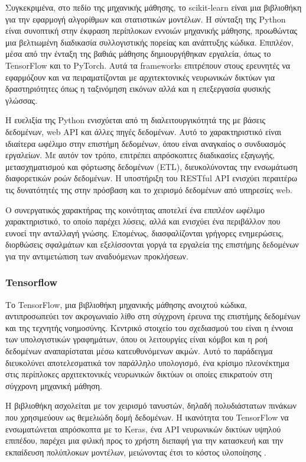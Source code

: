 Συγκεκριμένα, στο πεδίο της μηχανικής μάθησης, το scikit-learn είναι μια βιβλιοθήκη για την εφαρμογή αλγορίθμων και στατιστικών μοντέλων. Η σύνταξη της Python είναι συνοπτική στην έκφραση περίπλοκων εννοιών μηχανικής μάθησης, προωθώντας μια βελτιωμένη διαδικασία συλλογιστικής πορείας και ανάπτυξης κώδικα. Επιπλέον, μέσα από την ένταξη της βαθιάς μάθησης δημιουργήθηκαν εργαλεία, όπως το TensorFlow και το PyTorch. Αυτά τα frameworks επιτρέπουν στους ερευνητές να εφαρμόζουν και να πειραματίζονται με αρχιτεκτονικές νευρωνικών δικτύων για δραστηριότητες όπως η ταξινόμηση εικόνων αλλά και η επεξεργασία φυσικής γλώσσας.

Η ευελιξία της Python ενισχύεται από τη διαλειτουργικότητά της με βάσεις δεδομένων, web API και άλλες πηγές δεδομένων. Αυτό το χαρακτηριστικό είναι ιδιαίτερα ωφέλιμο στην επιστήμη δεδομένων, όπου είναι αναγκαίος ο συνδυασμός εργαλείων. Με αυτόν τον τρόπο, επιτρέπει απρόσκοπτες διαδικασίες εξαγωγής, μετασχηματισμού και φόρτωσης δεδομένων (ETL), διευκολύνοντας την ενσωμάτωση διαφορετικών ροών δεδομένων. Η υποστήριξη του RESTful API ενισχύει περαιτέρω τις δυνατότητές της στην πρόσβαση και το χειρισμό δεδομένων από υπηρεσίες web. 

Ο συνεργατικός χαρακτήρας της κοινότητας αποτελεί ένα επιπλέον ωφέλιμο χαρακτηριστικό, το οποίο παρέχει λύσεις, αλλά και ενισχύει ένα περιβάλλον που ευνοεί την ανταλλαγή γνώσης. Επομένως, διασφαλίζονται γρήγορες ενημερώσεις, διορθώσεις σφαλμάτων και εξελίσσονται γοργά τα εργαλεία της επιστήμης δεδομένων για την αντιμετώπιση των αναδυόμενων προκλήσεων.

\subsubsection{Tensorflow}
\label{subsec:tensor}

Το TensorFlow, μια βιβλιοθήκη μηχανικής μάθησης ανοιχτού κώδικα, αντιπροσωπεύει τον ακρογωνιαίο λίθο στη σύγχρονη έρευνα της επιστήμης δεδομένων και της τεχνητής νοημοσύνης. Κεντρικό στοιχείο του σχεδιασμού του είναι η έννοια των υπολογιστικών γραφημάτων, όπου οι λειτουργίες είναι κόμβοι και η ροή δεδομένων αναπαρίσταται μέσω κατευθυνόμενων ακμών. Αυτό το παράδειγμα διευκολύνει αποτελεσματικά τον παράλληλο υπολογισμό, ένα κρίσιμο πλεονέκτημα στις περίπλοκες αρχιτεκτονικές νευρωνικών δικτύων οι οποίες επικρατούν στη σύγχρονη μηχανική μάθηση. 

Η βιβλιοθήκη ασχολείται με τον χειρισμό τανυστών, δηλαδή πολυδιάστατων πινάκων που χρησιμεύουν ως θεμελιώδη δομή δεδομένων. Η ικανότητα του TensorFlow να ενσωματώνεται απρόσκοπτα με το Keras, ένα API νευρωνικών δικτύων υψηλού επιπέδου, παρέχει μια φιλική προς το χρήστη διεπαφή για την κατασκευή και την εκπαίδευση πολύπλοκων μοντέλων, μειώνοντας έτσι το κόστος υλοποίησης \cite{tensorflow2}. 

